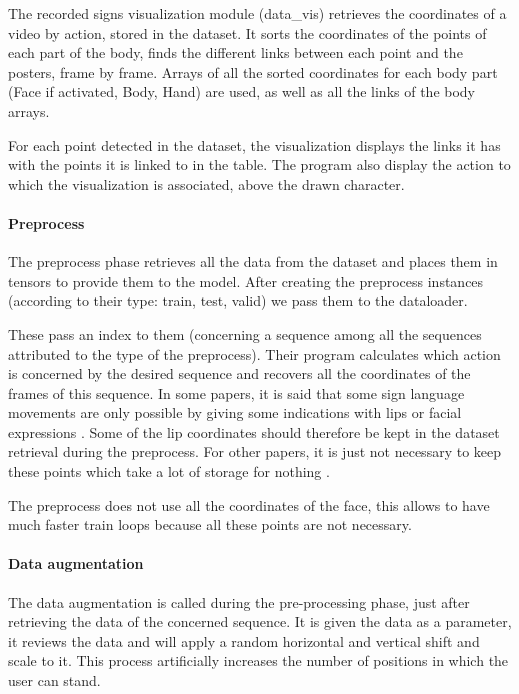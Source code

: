 The recorded signs visualization module (data\_vis) retrieves the coordinates of a video by action, stored in the dataset.
It sorts the coordinates of the points of each part of the body, finds the different links between each point and the posters, frame by frame. Arrays of all the sorted coordinates for each body part (Face if activated, Body, Hand) are used, as well as all the links of the body arrays.

For each point detected in the dataset, the visualization displays the links it has with the points it is linked to in the table. The program also display the action to which the visualization is associated, above the drawn character.

\paragraph{Preprocess}

The preprocess phase retrieves all the data from the dataset and places them in tensors to provide them to the model.
After creating the preprocess instances (according to their type: train, test, valid) we pass them to the dataloader. 

These pass an index to them (concerning a sequence among all the sequences attributed to the type of the preprocess). Their program calculates which action is concerned by the desired sequence and recovers all the coordinates of the frames of this sequence. 
In some papers, it is said that some sign language movements are only possible by giving some indications with lips or facial expressions \cite{cooper2011sign}. Some of the lip coordinates should therefore be kept in the dataset retrieval during the preprocess. For other papers, it is just not necessary to keep these points which take a lot of storage for nothing \cite{dreuw2007speech}.

The preprocess does not use all the coordinates of the face, this allows to have much faster train loops because all these points are not necessary.

\paragraph{Data augmentation}

The data augmentation is called during the pre-processing phase, just after retrieving the data of the concerned sequence. It is given the data as a parameter, it reviews the data and will apply a random horizontal and vertical shift and scale to it. This process artificially increases the number of positions in which the user can stand.

